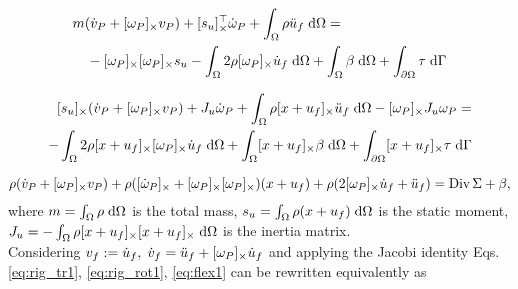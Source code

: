 \begin{equation}
\label{eq:rig_tr1}
\begin{split}
&m (\dot{{v}}_P + \crmat{\omega_P}v_P) + \crmat{s_u}^\top \dot{{\omega}}_P  + \int_{\Omega} \rho \ddot{u}_f \d{\Omega} = \\
&\quad - \crmat{\omega_P} \crmat{\omega_P} {s}_u - \int_{\Omega} 2 \rho \crmat{\omega_P} \dot{u}_f \d{\Omega} +  \int_{\Omega} \beta \d{\Omega} + \int_{\partial \Omega} \tau \d{\Gamma} 
\end{split}
\end{equation}

\begin{equation}
\label{eq:rig_rot1}
\begin{split}
\crmat{s_u} (\dot{{v}}_P + \crmat{\omega_P} v_P) + J_u \dot{\omega}_P + \int_{\Omega} \rho \crmat{x+u_f} \ddot{u}_f \d{\Omega} - \crmat{\omega_P} J_u \omega_P = \\ 
- \int_{\Omega} 2\rho \crmat{x+u_f} \crmat{\omega_P} \dot{u}_f \d{\Omega} + \int_{\Omega}\crmat{x+u_f} \beta \d{\Omega} + \int_{\partial \Omega}\crmat{x+u_f} \tau \d{\Gamma} \\
\end{split}
\end{equation}

\begin{equation}
\label{eq:flex1}
\rho (\dot{{v}}_P + [\omega_P]_{\times} v_P) + \rho ([\dot{\omega}_P]_{\times} + [\omega_P]_{\times}[\omega_P]_{\times})(x + u_f) + \rho (2 [\omega_P]_{\times} \dot{u}_f + \ddot{u}_f) = \operatorname*{Div}{\Sigma} + \beta,
\end{equation}
where $m = \int_{\Omega} \rho \d{\Omega}$ is the total mass,  $s_u = \int_{\Omega} \rho (x + u_f) \d{\Omega}$ is the static moment, $J_u= - \int_{\Omega} \rho \crmat{x+u_f}\crmat{x+u_f} \d{\Omega}$ is the inertia matrix. \\
Considering $v_f := \dot{u}_f, \; \dot{v}_f = \ddot{u}_f + [\omega_P]_{\times} \dot{u}_f$ and applying the Jacobi identity Eqs. \eqref{eq:rig_tr1}, \eqref{eq:rig_rot1}, \eqref{eq:flex1} can be rewritten equivalently as \\

